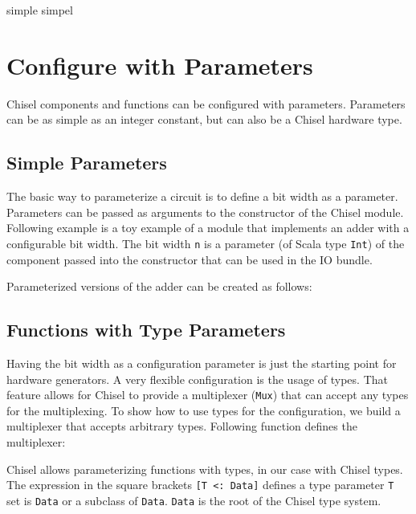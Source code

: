 \documentclass[%
    10pt,
    headinclude, footexclude,
    openright, %
    notitlepage,
    cleardoubleempty,
    headsepline,
    pointlessnumbers,
    bibtotoc, idxtotoc,
    ]{scrbook}
\newcommand{\code}[1]{{\small{\texttt{#1}}}}
\begin{document}
simple simpel 






\section{Configure with Parameters}

Chisel components and functions can be configured with parameters.
Parameters can be as simple as an integer constant, but can also be a Chisel
hardware type.

\subsection{Simple Parameters}

The basic way to parameterize a circuit is to define a bit width as a parameter.
Parameters can be passed as arguments to
the constructor of the Chisel module. Following example is a toy example of
a module that implements an adder with a configurable bit width.
The bit width \code{n} is a parameter (of Scala type \code{Int}) of the component
passed into the constructor that can be used in the IO bundle.


\noindent Parameterized versions of the adder can be created as follows:


\subsection{Functions with Type Parameters}

Having the bit width as a configuration parameter is just the starting point for
hardware generators. A very flexible configuration is the usage of types.
That feature allows for Chisel to provide a multiplexer (\code{Mux}) that
can accept any types for the multiplexing.
To show how to use types for the configuration, we build a multiplexer
that accepts arbitrary types. Following function defines the multiplexer:


Chisel allows parameterizing functions with types, in our case with Chisel
types. The expression in the square brackets \code{[T <: Data]} defines
a type parameter \code{T} set is \code{Data} or a subclass of \code{Data}.
\code{Data} is the root of the Chisel type system.
\end{document}
